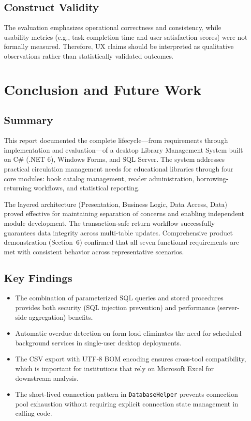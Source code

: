 \documentclass[12pt,a4paper]{article}
\begin{document}
\subsection{Construct Validity}
The evaluation emphasizes operational correctness and consistency, while usability metrics (e.g., task completion time and user satisfaction scores) were not formally measured. Therefore, UX claims should be interpreted as qualitative observations rather than statistically validated outcomes.

\section{Conclusion and Future Work}
\subsection{Summary}
This report documented the complete lifecycle---from requirements through implementation and evaluation---of a desktop Library Management System built on C\# (.NET 6), Windows Forms, and SQL Server. The system addresses practical circulation management needs for educational libraries through four core modules: book catalog management, reader administration, borrowing-returning workflows, and statistical reporting.

The layered architecture (Presentation, Business Logic, Data Access, Data) proved effective for maintaining separation of concerns and enabling independent module development. The transaction-safe return workflow successfully guarantees data integrity across multi-table updates. Comprehensive product demonstration (Section~6) confirmed that all seven functional requirements are met with consistent behavior across representative scenarios.

\subsection{Key Findings}
\begin{itemize}[leftmargin=1.5cm]
    \item The combination of parameterized SQL queries and stored procedures provides both security (SQL injection prevention) and performance (server-side aggregation) benefits.
    \item Automatic overdue detection on form load eliminates the need for scheduled background services in single-user desktop deployments.
    \item The CSV export with UTF-8 BOM encoding ensures cross-tool compatibility, which is important for institutions that rely on Microsoft Excel for downstream analysis.
    \item The short-lived connection pattern in \texttt{DatabaseHelper} prevents connection pool exhaustion without requiring explicit connection state management in calling code.
\end{itemize}
\end{document}
